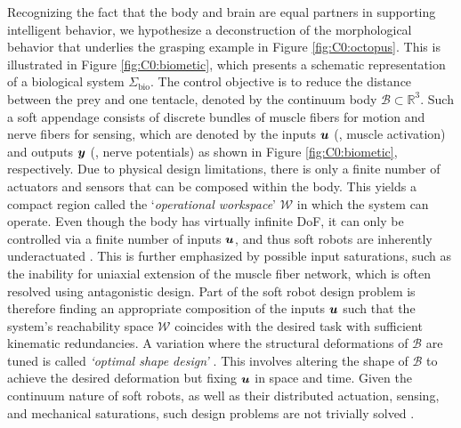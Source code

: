 Recognizing the fact that the body and brain are equal partners in supporting intelligent behavior, we hypothesize a deconstruction of the morphological behavior that underlies the grasping example in Figure \ref{fig:C0:octopus}. This is illustrated in Figure \ref{fig:C0:biometic}, which presents a schematic representation of a biological system $\Sigma_{\textrm{bio}}$. The control objective is to reduce the distance between the prey and one tentacle, denoted by the continuum body $\mathcal{B} \subset \mathbb{R}^3$. Such a soft appendage consists of discrete bundles of muscle fibers for motion and nerve fibers for sensing, which are denoted by the inputs ${\boldsymbol{u}}$ (\eg, muscle activation) and outputs ${\boldsymbol{y}}$ (\eg, nerve potentials) as shown in Figure \ref{fig:C0:biometic}, respectively. Due to physical design limitations, there is only a finite number of actuators and sensors that can be composed within the body. This yields a compact region called the `\emph{operational workspace}' $\mathcal{W}$ \cite{Spong1996, Murray1994, Ortega1998} in which the system can operate. Even though the body has virtually infinite DoF, it can only be controlled via a finite number of inputs ${\boldsymbol{u}}$, and thus soft robots are inherently underactuated \cite{Spong1996,Russ2022}. This is further emphasized by possible input saturations, such as the inability for uniaxial extension of the muscle fiber network, which is often resolved using antagonistic design. Part of the soft robot design problem is therefore finding an appropriate composition of the inputs ${\boldsymbol{u}}$ such that the system's reachability space $\mathcal{W}$ coincides with the desired task with sufficient kinematic redundancies. A variation where the structural deformations of $\mathcal{B}$ are tuned is called \textit{`optimal shape design'} \cite{Bendsoe2003}. This involves altering the shape of $\mathcal{B}$ to achieve the desired deformation but fixing ${\boldsymbol{u}}$ in space and time. Given the continuum nature of soft robots, as well as their distributed actuation, sensing, and mechanical saturations, such design problems are not trivially solved \cite{Xavier2022Jun,Bern2019,Coevoet2017Feb,Tian2020May,Smith2022}.

